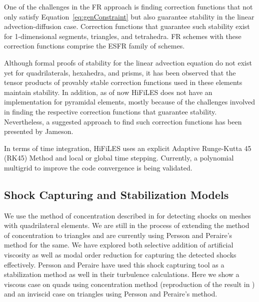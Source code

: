 One of the challenges in the FR approach is finding correction functions that not only satisfy Equation~\eqref{eq:genConstraint} but also guarantee stability in the linear advection-diffusion case. Correction functions that guarantee such stability exist for 1-dimensional segments\cite{vincent2011new}, triangles\cite{castonguay2012new,williams2013tri}, and tetrahedra\cite{williams2013tet}. FR schemes with these correction functions comprise the ESFR family of schemes.

Although formal proofs of stability for the linear advection equation do not exist yet for quadrilaterals, hexahedra, and prisms, it has been observed that the tensor products of provably stable correction functions used in these elements maintain stability. In addition, as of now HiFiLES does not have an implementation for pyramidal elements, mostly because of the challenges involved in finding the respective correction functions that guarantee stability. Nevertheless, a suggested approach to find such correction functions has been presented by Jameson\cite{jameson2011advances}.

In terms of time integration, HiFiLES uses an explicit Adaptive Runge-Kutta 45 (RK45) Method and local or global time stepping. Currently, a polynomial multigrid to improve the code convergence is being validated.

\subsection{Shock Capturing and Stabilization Models}

We use the method of concentration described in \cite{abhishekshockcapture} for detecting shocks on meshes with quadrilateral elements. We are still in the process of extending the method of concentration to triangles and are currently using Persson and Peraire's method \cite{Persson06} \cite{Persson13} for the same. We have explored both selective addition of artificial viscosity as well as modal order reduction for capturing the detected shocks effectively. Persson and Peraire have used this shock capturing tool as a stabilization method as well in their turbulence calculations. Here we show a viscous case on quads using concentration method (reproduction of the result in \cite{abhishekshockcapture}) and an inviscid case on triangles using Persson and Peraire's method.

